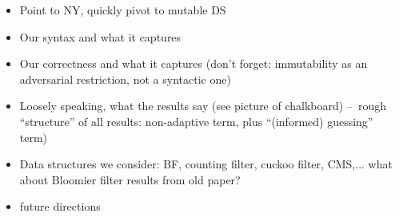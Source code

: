 \newcommand{\err}{\varfont{err}}
\newcommand{\ct}{\varfont{ct}}
\renewcommand{\st}{\varfont{st}}
\newcommand{\salt}{Z}

\newcommand{\REPO}{\oraclefont{Rep}}
\newcommand{\UPO}{\oraclefont{Up}}
\newcommand{\QRYO}{\oraclefont{Qry}}
\newcommand{\PRFO}{\oraclefont{F}}

\newcommand{\xx}{\vectorfont{x}}
\newcommand{\vv}{\vectorfont{v}}
\newcommand{\REVO}{\mathbf{Reveal}}
\newcommand{\HASHO}{\oraclefont{Hash}}
\newcommand{\INTO}{\oraclefont{Int}}
\newcommand{\diffplus}[1]{\fbox{#1}}
\newcommand{\diffplusbox}[1]{\fbox{\parbox{\dimexpr\textwidth-2\fboxsep-2\fboxrule\relax}{#1}}}
\newcommand{\diffminus}[1]{\colorbox{lightgray}{#1}}
\newcommand{\diffminusbox}[1]{\colorbox{lightgray}{\parbox{\dimexpr\textwidth-2\fboxsep-2\fboxrule\relax}{#1}}}
\newcommand{\hh}{\vectorfont{h}}
\newcommand{\fff}{\schemefont{Fn}}
\newcommand{\Rnd}{\schemefont{Rand}}
\newcommand{\Repx}{\Rep1}
\newcommand{\Qryx}{\Qry1}
\newcommand{\Upx}{\Up1}
\newcommand{\Ans}{\varfont{Ans}}
\newcommand{\setE}{\mathcal{E}}
\newcommand{\Resp}{\varfont{Resp}}
\def\ticks(#1,#2){\procfont{T}_{\hspace*{-1.5pt}#1}({#2})}
\newcommand{\highlighto}[1]{\colorbox{lightgray}{$\scriptstyle #1$}}
\newcommand{\highlight}[1]{\colorbox{lightgray}{$\displaystyle #1$}}

\def\v.#1{\boldsymbol{#1}}
\newcommand{\bmap}{\varfont{B}}
\newcommand{\hw}{\varfont{w}}

\newcommand{\emptystring}{\varepsilon}

\begin{itemize}
\item Point to NY, quickly pivot to mutable DS
\item Our syntax and what it captures
\item Our correctness and what it captures (don't forget: immutability as an
  adversarial restriction, not a syntactic one) 
\item Loosely speaking, what the results say (see picture of
  chalkboard) --~rough ``structure'' of all results: non-adaptive
  term, plus ``(informed) guessing'' term)
\item Data structures we consider: BF, counting filter, cuckoo filter,
  CMS,... what about Bloomier filter results from old paper?
\item future directions
\end{itemize}

